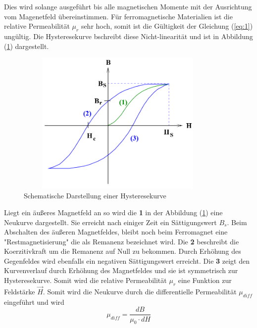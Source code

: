 Dies wird solange ausgeführt bis alle magnetischen Momente mit der Ausrichtung vom Magenetfeld übereinstimmen.
Für ferromagnetische Materialien ist die relative Permeabilität $\mu_r$ sehr hoch, somit ist die Gültigkeit der
Gleichung (\ref{eq:1}) ungültig.
Die Hysteresekurve bschreibt diese Nicht-linearität und ist in Abbildung (\ref{abb:3}) dargestellt.
\begin{figure}[H]
  \centering
  \includegraphics[width=10cm, height= 7cm]{Abb3.png}
  \caption{Schematische Darstellung einer Hysteresekurve}
  \label{abb:3}
\end{figure}
Liegt ein äußeres Magnetfeld an so wird die \textbf{1} in der Abbildung (\ref{abb:3}) eine
Neukurve dargestellt. Sie erreicht nach einiger Zeit ein Sättigungswert $B_s$. Beim Abschalten
des äußeren Magnetfeldes, bleibt noch beim Ferromagnet eine "Restmagnetisierung" die
als Remanenz bezeichnet wird. Die \textbf{2} beschreibt die Koerzitivkraft um die Remanenz auf Null zu bekommen.
Durch Erhöhung des Gegenfeldes wird ebenfalls ein negativen Sättigungswert erreicht.
Die \textbf{3} zeigt den Kurvenverlauf durch Erhöhung des Magnetfeldes und sie ist symmetrisch zur Hysteresekurve.
Somit wird die relative Permeabilität $\mu_r$ eine Funktion zur Feldstärke $\vec{H}$.
Somit wird die Neukurve durch die differentielle Permeabilität $\mu_{diff}$ eingeführt und wird
\begin{equation}
  \mu_{diff} = \frac{dB}{\mu_0 \cdot dH}
  \label{eq:6}
\end{equation}

